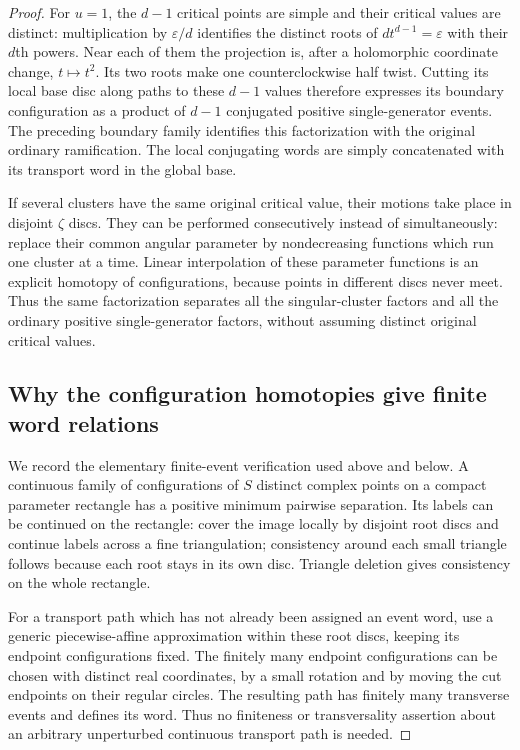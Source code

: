 \documentclass[11pt,a4paper]{article}
\theoremstyle{remark}
\begin{document}
\begin{proof}
For $u=1$, the $d-1$ critical points are simple and their critical
values are distinct: multiplication by $\varepsilon/d$ identifies the
distinct roots of $dt^{d-1}=\varepsilon$ with their $d$th powers.
Near each of them the projection is, after a holomorphic coordinate
change, $t\mapsto t^2$.  Its two roots make one counterclockwise half
twist.  Cutting its local base disc along paths to these $d-1$ values
therefore expresses its boundary configuration as a product of
$d-1$ conjugated positive single-generator events.  The preceding
boundary family identifies this factorization with the original
ordinary ramification.  The local conjugating words are simply
concatenated with its transport word in the global base.

If several clusters have the same original critical value, their motions
take place in disjoint $\zeta$ discs.  They can be performed consecutively
instead of simultaneously: replace their common angular parameter by
nondecreasing functions which run one cluster at a time.  Linear
interpolation of these parameter functions is an explicit homotopy of
configurations, because points in different discs never meet.  Thus the
same factorization separates all the singular-cluster factors and all
the ordinary positive single-generator factors, without assuming
distinct original critical values.

\subsection{Why the configuration homotopies give finite word relations}

We record the elementary finite-event verification used above and
below.  A continuous family of configurations of $S$ distinct complex
points on a compact parameter rectangle has a positive minimum pairwise
separation.  Its labels can be continued on the rectangle: cover the
image locally by disjoint root discs and continue labels across a fine
triangulation; consistency around each small triangle follows because
each root stays in its own disc.  Triangle deletion gives consistency
on the whole rectangle.

For a transport path which has not already been assigned an event word,
use a generic piecewise-affine approximation within these root discs,
keeping its endpoint configurations fixed.  The finitely many endpoint
configurations can be chosen with distinct real coordinates, by a small
rotation and by moving the cut endpoints on their regular circles.
The resulting path has finitely many transverse events and defines its
word.  Thus no finiteness or transversality assertion about an arbitrary
unperturbed continuous transport path is needed.


\end{proof}
\end{document}
